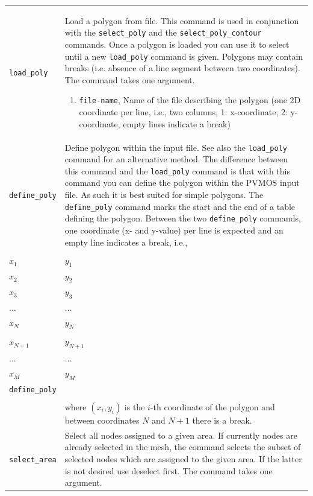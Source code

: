 \documentclass[noshowpacs,preprintnumbers,amsmath,amssymb, letter]{revtex4}
\begin{document}
\begin{longtable}{p{}p{}}
\texttt{load\_poly}	& Load a polygon from file. This command is used in conjunction with the \texttt{select\_poly} and the \texttt{select\_poly\_contour} commands. Once a polygon is loaded you can use it to select until a new \texttt{load\_poly} command is given. Polygons may contain breaks (i.e. absence of a line segment between two coordinates). The command takes one argument.
\begin{enumerate}
\item \texttt{file-name}, Name of the file describing the polygon (one 2D coordinate per line, i.e., two columns, 1: x-coordinate, 2: y-coordinate, empty lines indicate a break)
\end{enumerate}\\
\texttt{define\_poly}	& Define polygon within the input file. See also the \texttt{load\_poly} command for an alternative method. The difference between this command and the \texttt{load\_poly} command is that with this command you can define the polygon within the PVMOS input file. As such it is best suited for simple polygons. The \texttt{define\_poly} command marks the start and the end of a table defining the polygon. Between the two \texttt{define\_poly} commands, one coordinate (x- and y-value) per line is expected and an empty line indicates a break, i.e.,\\
&
\begin{tabular}{ll}
	\texttt{define\_poly} \\
	$x_1$ & $y_1$ \\
	$x_2$ & $y_2$ \\
	$x_3$ & $y_3$ \\
	... & ... \\
	$x_N$ & $y_N$ \\
	\\
	$x_{N+1}$ & $y_{N+1}$ \\
	... & ... \\
	$x_M$ & $y_M$ \\
	\texttt{define\_poly} \\
\end{tabular}\\
&where $(x_i,y_i)$ is the $i$-th coordinate of the polygon and between coordinates $N$ and $N+1$ there is a break.\\
\texttt{select\_area}	& Select all nodes assigned to a given area. If currently nodes are already selected in the mesh, the command selects the subset of selected nodes which are assigned to the given area. If the latter is not desired use deselect first. The command takes one argument.

\end{longtable}
\end{document}
